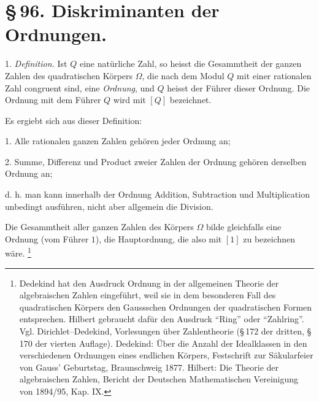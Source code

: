 \documentclass[11pt]{article}
\begin{document}
\section*{\S\,96. Diskriminanten der Ordnungen.}

1. \emph{Definition.} Ist $Q$ eine natürliche Zahl, so heisst die Gesammtheit der ganzen Zahlen des quadratischen Körpers $\Omega$, die nach dem Modul $Q$ mit einer rationalen Zahl congruent sind, eine \emph{Ordnung}, und $Q$ heisst der Führer dieser Ordnung. Die Ordnung mit dem Führer $Q$ wird mit $[Q]$ bezeichnet.

Es ergiebt sich aus dieser Definition:

1. Alle rationalen ganzen Zahlen gehören jeder Ordnung an;

2. Summe, Differenz und Product zweier Zahlen der Ordnung gehören derselben Ordnung an;

d. h. man kann innerhalb der Ordnung Addition, Subtraction und Multiplication unbedingt ausführen, nicht aber allgemein die Division.

Die Gesammtheit aller ganzen Zahlen des Körpers $\Omega$ bilde gleichfalls eine Ordnung (vom Führer $1$), die Hauptordnung, die also mit $[1]$ zu bezeichnen wäre.
\footnote{Dedekind hat den Ausdruck Ordnung in der allgemeinen Theorie der algebraischen Zahlen eingeführt, weil sie in dem besonderen Fall des quadratischen Körpers den Gaussschen Ordnungen der quadratischen Formen entsprechen. Hilbert gebraucht dafür den Ausdruck ``Ring'' oder ``Zahlring''. Vgl. Dirichlet--Dedekind, Vorlesungen über Zahlentheorie (\S\,172 der dritten, \S\,170 der vierten Auflage). Dedekind: Über die Anzahl der Idealklassen in den verschiedenen Ordnungen eines endlichen Körpers, Festschrift zur Säkularfeier von Gauss' Geburtstag, Braunschweig 1877. Hilbert: Die Theorie der algebraischen Zahlen, Bericht der Deutschen Mathematischen Vereinigung von 1894/95, Kap. IX.}
\end{document}
